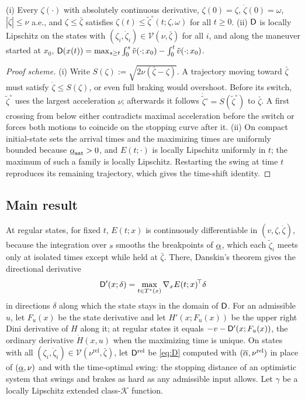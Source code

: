 \begin{lemma}\label{lem:envelope}
(i) Every $\zeta(\cdot)$ with absolutely continuous derivative, $\zeta(0)=\zeta$, $\dot\zeta(0)=\omega$, $|\ddot\zeta|\le\nu$ a.e., and $\zeta\le\bar\zeta$ satisfies $\zeta(t)\le\tilde\zeta^{\circ}(t;\zeta,\omega)$ for all $t\ge0$. (ii) $\mathsf{D}$ is locally Lipschitz on the states with $(\zeta_i,\dot\zeta_i)\in\mathcal V(\nu,\bar\zeta)$ for all $i$, and along the maneuver started at $x_0$, $\mathsf{D}(x(t))=\max_{s\ge t}\int_0^s\tilde v(\cdot;x_0)-\int_0^t\tilde v(\cdot;x_0)$.
\end{lemma}
\begin{proof}[Proof scheme]
(i) Write $S(\zeta):=\sqrt{2\nu(\bar\zeta-\zeta)}$. A trajectory moving toward $\bar\zeta$ must satisfy $\dot\zeta\le S(\zeta)$, or even full braking would overshoot. Before its switch, $\tilde\zeta^{\circ}$ uses the largest acceleration $\nu$; afterwards it follows $\dot{\tilde\zeta}{}^{\circ}=S(\tilde\zeta^{\circ})$ to $\bar\zeta$. A first crossing from below either contradicts maximal acceleration before the switch or forces both motions to coincide on the stopping curve after it. (ii) On compact initial-state sets the arrival times and the maximizing times are uniformly bounded because $\underline{\alpha}_{\rm sat}>0$, and $E(t;\cdot)$ is locally Lipschitz uniformly in $t$; the maximum of such a family is locally Lipschitz. Restarting the swing at time $t$ reproduces its remaining trajectory, which gives the time-shift identity.
\end{proof}

\subsection{Main result}\label{sec:main}

At regular states, for fixed $t$, $E(t;x)$ is continuously differentiable in $(v,\zeta,\dot\zeta)$, because the integration over $s$ smooths the breakpoints of $\underline{\alpha}$, which each $\tilde\zeta_i$ meets only at isolated times except while held at $\bar\zeta$. There, Danskin's theorem \cite{clarke1990optimization} gives the directional derivative
\begin{equation}
\mathsf{D}'(x;\delta)=\max_{t\in T^\star(x)}\nabla_xE(t;x)^{\!\top}\delta
\label{eq:dirder}
\end{equation}
in directions $\delta$ along which the state stays in the domain of $\mathsf{D}$. For an admissible $u$, let $F_u(x)$ be the state derivative and let $H'(x;F_u(x))$ be the upper right Dini derivative of $H$ along it; at regular states it equals $-v-\mathsf{D}'(x;F_u(x))$, the ordinary derivative $\dot H(x,u)$ when the maximizing time is unique. On states with all $(\zeta_i,\dot\zeta_i)\in\mathcal{V}(\nu^{\mathrm{rel}},\bar\zeta)$, let $\mathsf{D}^{\mathrm{rel}}$ be \eqref{eq:D} computed with $(\overline{\alpha},\nu^{\mathrm{rel}})$ in place of $(\underline{\alpha},\nu)$ and with the time-optimal swing: the stopping distance of an optimistic system that swings and brakes as hard as any admissible input allows. Let $\gamma$ be a locally Lipschitz extended class-$\mathcal{K}$ function.

